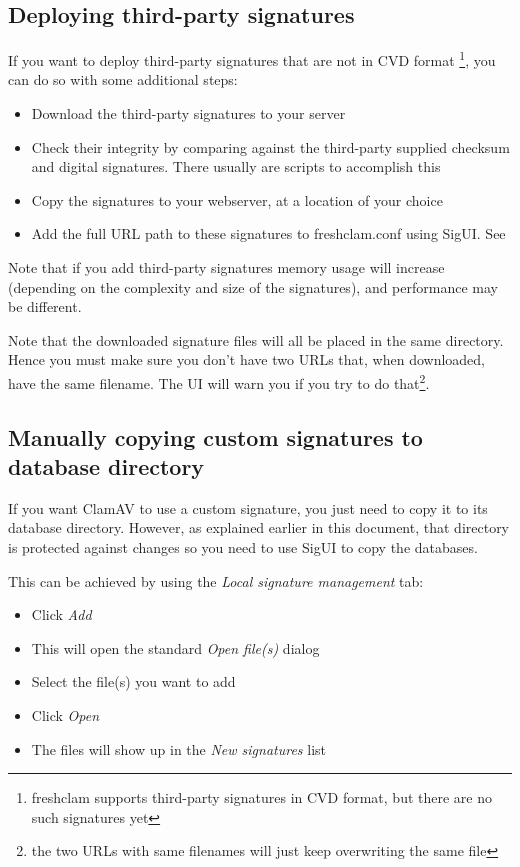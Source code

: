 \subsection{Deploying third-party signatures}

If you want to deploy third-party signatures that are not in \gls{CVD} format \footnote{freshclam supports third-party signatures in CVD format, but there are no such signatures yet}, you can do so with some additional steps:
\begin{itemize}
\item Download the third-party signatures to your server
\item Check their integrity by comparing against the third-party supplied checksum and digital signatures. There usually are scripts to accomplish this
\item Copy the signatures to your webserver, at a location of your choice
\item Add the full URL path to these signatures to \gls{freshclam.conf} using \gls{SigUI}.
See 
\end{itemize}

Note that if you add third-party signatures memory usage will increase (depending on the complexity and size of the signatures), and performance may be different.

Note that the downloaded signature files will all be placed in the same directory. Hence you must make sure you don't have two URLs that, when downloaded, have the same filename.
The UI will warn you if you try to do that\footnote{the two URLs with same filenames will just keep overwriting the same file}.

\subsection{Manually copying custom signatures to database directory}
\label{sec:custommanual}
If you want \gls{ClamAV} to use a custom signature, you just need to copy it to its database directory. However, as explained earlier in this document, that directory is protected against changes so you need to use SigUI to copy the databases.

This can be achieved by using the \emph{Local signature management} tab:
\begin{itemize}
\item Click \emph{Add}
\item This will open the standard \emph{Open file(s)} dialog
\item Select the file(s) you want to add
\item Click \emph{Open}
\item The files will show up in the \emph{New signatures} list
\end{itemize}

